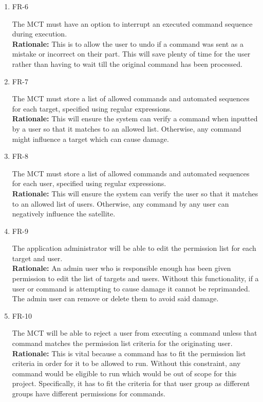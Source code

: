 \documentclass[12pt]{article}
\begin{document}
\begin{enumerate}
    \item{FR-6\\}
        
    The MCT must have an option to interrupt an executed command sequence during execution. \\
    \textbf{Rationale:} This is to allow the user to undo if a command was sent as a mistake or incorrect on their part. This will save plenty of time for the user rather than having to wait till the original command has been processed. 

    \item{FR-7\\}
    
    The MCT must store a list of allowed commands and automated sequences for each target, specified using regular expressions. \\
    \textbf{Rationale:} This will ensure the system can verify a command when inputted by a user so that it matches to an allowed list. Otherwise, any command might influence a target which can cause damage.

    \item{FR-8\\}
        
    The MCT must store a list of allowed commands and automated sequences for each user, specified using regular expressions. \\
    \textbf{Rationale:} This will ensure the system can verify the user so that it matches to an allowed list of users. Otherwise, any command by any user can negatively influence the satellite. 

    \item{FR-9\\}
    
    The application administrator will be able to edit the permission list for each target and user. \\
    \textbf{Rationale:} An admin user who is responsible enough has been given permission to edit the list of targets and users. Without this functionality, if a user or command is attempting to cause damage it cannot be reprimanded. The admin user can remove or delete them to avoid said damage. 

    \item{FR-10\\}
    
    The MCT will be able to reject a user from executing a command unless that command matches the permission list criteria for the originating user. \\
    \textbf{Rationale:} This is vital because a command has to fit the permission list criteria in order for it to be allowed to run. Without this constraint, any command would be eligible to run which would be out of scope for this project. Specifically, it has to fit the criteria for that user group as different groups have different permissions for commands. 


\end{enumerate}
\end{document}

